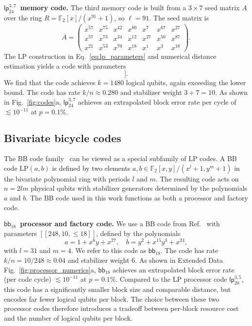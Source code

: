 \documentclass[reprint,twocolumn,secnumarabic,amssymb, aps, prx]{revtex4-2}
\newcommand{\bb}{\mbox{$\mathsf{bb}_{18}$}}
\newcommand{\lpmemlarge}{\mbox{$\mathsf{lp}_{24}^{3, 7}$}}
\newcommand{\lpproc}{\mbox{$\mathsf{lp}^{3, 5}_{20}$}}
\begin{document}
\medskip
\noindent\textbf{\lpmemlarge\ memory code.}
The third memory code is built from a $3 \times 7$ seed matrix $A$ over the ring \mbox{$R = \mathbb{F}_2[x]/(x^{91}+1)$}, so $\ell = 91$. The seed matrix is
\begin{equation}\label{eq:seed_lp24}
  A = \begin{pmatrix}
    x^{57} & x^{75} & x^{42} & x^{80} & x^{7}  & x^{67} & x^{27} \\
    x^{57} & x^{73} & x^{34} & x^{12} & x^{27} & x^{50} & x^{87} \\
    x^{21} & x^{53} & x^{70} & x^{18} & x^{1}  & x^{3}  & x^{18}
  \end{pmatrix}.
\end{equation}
The LP construction in Eq.~\eqref{eq:lp_parameters} and numerical distance estimation yields a code with parameters
\begin{equation}
  [[n = 5278, \quad k \geq 1456, \quad d \leq 24\,]].
\end{equation}
We find that the code achieves $k = 1480$ logical qubits, again exceeding the lower bound. The code has rate $k/n \approx 0.280$ and stabilizer weight $3+7 = 10$. As shown in Fig.~\ref{fig:codes}a, $\lpmemlarge$ achieves an extrapolated block error rate per cycle of $\lesssim 10^{-11}$ at $p=0.1\%$.

\subsection{Bivariate bicycle codes\label{app:bb_codes}}
The BB code family~\cite{bravyi2024high} can be viewed as a special subfamily of LP codes. A BB code $\mathrm{LP}(a, b)$ is defined by two elements \mbox{$a, b \in \mathbb{F}_2[x, y]/(x^l + 1, y^m + 1)$} in the bivariate polynomial ring with periods $l$ and $m$. The resulting code acts on $n = 2lm$ physical qubits with stabilizer generators determined by the polynomials $a$ and $b$. The BB code used in this work functions as both a processor and factory code.

\medskip
\noindent\textbf{$\bb$\ processor and factory code.}
We use a BB code from Ref.~\cite{symons2025sequences} with parameters $[[248, 10, \leq 18]]$, defined by the polynomials
\begin{equation}\label{eq:bb_processor}
  a = 1 + x^6y + x^{27}, \quad b = y^2 + x^{15}y^3 + x^{24},
\end{equation}
with $l = 31$ and $m = 4$. We refer to this code as $\bb$. The code has rate $k/n = 10/248 \approx 0.04$ and stabilizer weight $6$. As shown in Extended Data Fig.~\ref{fig:processor_numerics}a, $\bb$ achieves an extrapolated block error rate (per code cycle) $\lesssim 10^{-11}$ at $p=0.1\%$. Compared to the LP processor code $\lpproc$, this code has a significantly smaller block size and comparable distance, but encodes far fewer logical qubits per block. 
The choice between these two processor codes therefore introduces a tradeoff between per-block resource cost and the number of logical qubits per block.
\end{document}
